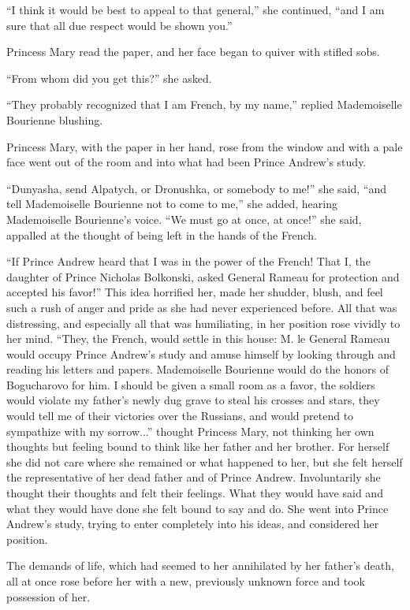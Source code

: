 ``I think it would be best to appeal to that general,'' she
continued, ``and I am sure that all due respect would be shown
you.''

Princess Mary read the paper, and her face began to quiver with
stifled sobs.

``From whom did you get this?'' she asked.

``They probably recognized that I am French, by my name,''
replied Mademoiselle Bourienne blushing.

Princess Mary, with the paper in her hand, rose from the window
and with a pale face went out of the room and into what had been
Prince Andrew's study.

``Dunyasha, send Alpatych, or Dronushka, or somebody to me!'' she
said, ``and tell Mademoiselle Bourienne not to come to me,'' she
added, hearing Mademoiselle Bourienne's voice. ``We must go at
once, at once!'' she said, appalled at the thought of being left
in the hands of the French.

``If Prince Andrew heard that I was in the power of the French!
That I, the daughter of Prince Nicholas Bolkonski, asked General
Rameau for protection and accepted his favor!'' This idea
horrified her, made her shudder, blush, and feel such a rush of
anger and pride as she had never experienced before. All that was
distressing, and especially all that was humiliating, in her
position rose vividly to her mind. ``They, the French, would
settle in this house: M. le General Rameau would occupy Prince
Andrew's study and amuse himself by looking through and reading
his letters and papers. Mademoiselle Bourienne would do the
honors of Bogucharovo for him. I should be given a small room as
a favor, the soldiers would violate my father's newly dug grave
to steal his crosses and stars, they would tell me of their
victories over the Russians, and would pretend to sympathize with
my sorrow...'' thought Princess Mary, not thinking her own
thoughts but feeling bound to think like her father and her
brother. For herself she did not care where she remained or what
happened to her, but she felt herself the representative of her
dead father and of Prince Andrew. Involuntarily she thought their
thoughts and felt their feelings. What they would have said and
what they would have done she felt bound to say and do. She went
into Prince Andrew's study, trying to enter completely into his
ideas, and considered her position.

The demands of life, which had seemed to her annihilated by her
father's death, all at once rose before her with a new,
previously unknown force and took possession of her.

